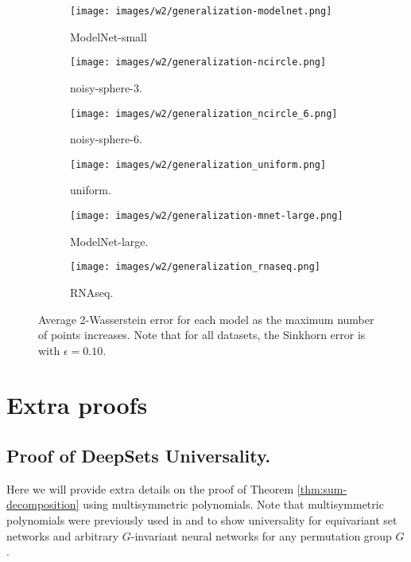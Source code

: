 \documentclass[12pt]{article}
\begin{document}
\begin{figure}
     \centering
     \begin{subfigure}[b]{0.30\textwidth}
         \centering
         \texttt{[image: images/w2/generalization-modelnet.png]}
         \caption{ModelNet-small}
     \end{subfigure}
     \hfill
     \begin{subfigure}[b]{0.30\textwidth}
         \centering
         \texttt{[image: images/w2/generalization-ncircle.png]}
         \caption{noisy-sphere-3.}
     \end{subfigure}
     \hfill
     \begin{subfigure}[b]{0.30\textwidth}
         \centering
         \texttt{[image: images/w2/generalization\_ncircle\_6.png]}
         \caption{noisy-sphere-6.}
     \end{subfigure}
     \hfill
     \begin{subfigure}[b]{0.30\textwidth}
         \centering
         \texttt{[image: images/w2/generalization\_uniform.png]}
         \caption{uniform.}
     \end{subfigure}
     \hfill
     \begin{subfigure}[b]{0.30\textwidth}
         \centering
         \texttt{[image: images/w2/generalization-mnet-large.png]}
         \caption{ModelNet-large.}
     \end{subfigure}
     \hfill
     \begin{subfigure}[b]{0.30\textwidth}
         \centering
         \texttt{[image: images/w2/generalization\_rnaseq.png]}
         \caption{RNAseq.}
     \end{subfigure}
        \caption{Average 2-Wasserstein error for each model as the maximum number of points increases. Note that for all datasets, the Sinkhorn error is with $\epsilon = 0.10$.}
        \label{fig:generalization_graph}
\end{figure}



\section{Extra proofs}


\subsection{Proof of DeepSets Universality.}
\label{appendix:deepsets}
Here we will provide extra details on the proof of Theorem \ref{thm:sum-decomposition} using multisymmetric polynomials. Note that multisymmetric polynomials were previously used in  \citep{segol2019universal} and \citep{maron2019universality} to show universality for equivariant set networks and arbitrary $G$-invariant neural networks for any permutation group $G$.
\end{document}
